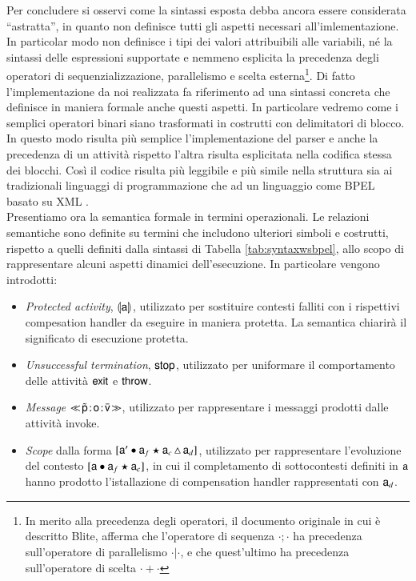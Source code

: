 Per concludere si osservi come la sintassi esposta debba ancora essere 
considerata ``astratta'', in quanto non definisce tutti gli aspetti necessari
all'imlementazione. In particolar modo non definisce i tipi dei valori
attribuibili alle variabili, né la sintassi delle espressioni supportate e
nemmeno esplicita la precedenza degli operatori di sequenzializzazione,
parallelismo e scelta esterna\footnote{In merito alla precedenza degli
operatori, il documento originale in cui è descritto Blite, afferma che
l'operatore di sequenza $\cdot ; \cdot$ ha precedenza
sull'operatore di parallelismo $\cdot | \cdot$, e che quest'ultimo ha precedenza
sull'operatore di scelta $\cdot + \cdot$}. Di fatto l'implementazione da noi
realizzata fa riferimento ad una sintassi concreta che definisce in maniera
formale anche questi aspetti. In particolare vedremo come  i semplici
operatori binari siano trasformati in costrutti con 
delimitatori di blocco. In questo modo risulta più semplice
l'implementazione del parser 
e anche la
precedenza di un attività rispetto l'altra risulta esplicitata nella codifica
stessa dei blocchi. Così il codice risulta più leggibile e più simile nella
struttura sia ai tradizionali linguaggi di programmazione che ad un linguaggio come BPEL basato su XML .
\\

Presentiamo ora la semantica formale in termini operazionali. Le relazioni
semantiche sono definite su termini che includono ulteriori
simboli e costrutti, rispetto a quelli definiti dalla sintassi di Tabella
\ref{tab:syntaxwsbpel}, allo scopo di rappresentare alcuni aspetti dinamici
dell'esecuzione. In particolare vengono introdotti:

\begin{itemize}
  \item \emph{Protected activity}, $\llparenthesis {\sf a}\rrparenthesis$, utilizzato per sostituire
  contesti falliti con i rispettivi compesation handler da eseguire in maniera
  protetta. La semantica chiarirà il significato di esecuzione protetta.
  
  \item \emph{Unsuccessful termination}, ${\sf stop}$, utilizzato per uniformare il
  comportamento delle attività ${\sf exit}$ e ${\sf throw}$.
  
  \item \emph{Message} $\ll\!\tilde{{\sf p}}\! : \! {\sf o}\! : \! \bar{{\sf v}}\!\gg$, utilizzato per
  rappresentare i messaggi prodotti dalle attività invoke.
    
  \item \emph{Scope} dalla forma $[{\sf a}' \bullet {\sf a}_f \star {\sf a}_c\, \triangle\, {\sf a}_d]$,
  utilizzato per rappresentare l'evoluzione del contesto
  $[{\sf a} \bullet {\sf a}_f \star {\sf a}_c]$, in cui il completamento di sottocontesti
  definiti in ${\sf a}$ hanno prodotto l'istallazione di compensation handler
  rappresentati con ${\sf a}_d$.
\end{itemize}

